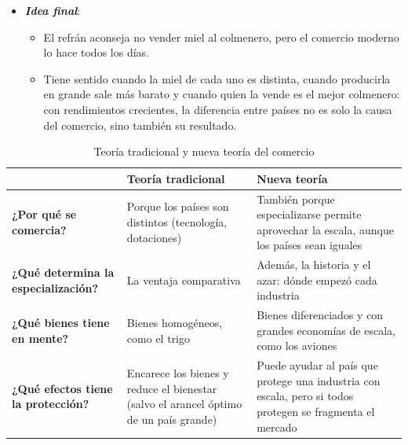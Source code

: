 \documentclass[11pt]{article}
\begin{document}
\begin{itemize}
\begin{itemize}
  \item Los modelos nuevos cambian sobre todo \emph{cómo} se gana y \emph{quién} gana o pierde, no \emph{cuánto}: piden abrirse ayudando a las empresas a empezar a exportar y a los trabajadores a pasar de las que cierran a las que crecen.
  \end{itemize}
\item \textbf{\emph{Idea final}}:
  \begin{itemize}
  \item El refrán aconseja no vender miel al colmenero, pero el comercio moderno lo hace todos los días.

  \item Tiene sentido cuando la miel de cada uno es distinta, cuando producirla en grande sale más barato y cuando quien la vende es el mejor colmenero: con rendimientos crecientes, la diferencia entre países no es solo la causa del comercio, sino también su resultado.
  \end{itemize}
\end{itemize}

\begin{table}[H]
\centering
\caption{Teoría tradicional y nueva teoría del comercio}\label{tab:tradicional-nueva}
\small
\begin{tabular}{>{\raggedright\arraybackslash}m{3.4cm}>{\raggedright\arraybackslash}m{5.4cm}>{\raggedright\arraybackslash}m{6.0cm}}
\toprule
\rowcolor{tceeazulpalido} & \textbf{Teoría tradicional} & \textbf{Nueva teoría}\\
\midrule
\textbf{¿Por qué se comercia?} & Porque los países son distintos (tecnología, dotaciones) & También porque especializarse permite aprovechar la escala, aunque los países sean iguales\\
\addlinespace[0.3em]
\textbf{¿Qué determina la especialización?} & La ventaja comparativa & Además, la historia y el azar: dónde empezó cada industria\\
\addlinespace[0.3em]
\textbf{¿Qué bienes tiene en mente?} & Bienes homogéneos, como el trigo & Bienes diferenciados y con grandes economías de escala, como los aviones\\
\addlinespace[0.3em]
\textbf{¿Qué efectos tiene la protección?} & Encarece los bienes y reduce el bienestar (salvo el arancel óptimo de un país grande) & Puede ayudar al país que protege una industria con escala, pero si todos protegen se fragmenta el mercado\\
\bottomrule
\end{tabular}
\end{table}
\end{document}
